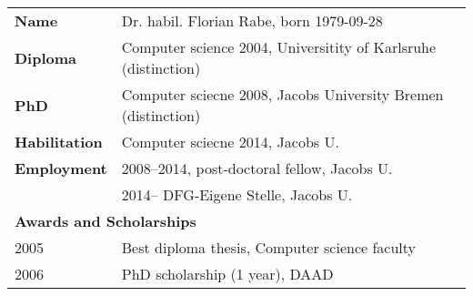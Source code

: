 \newcommand{\tb}{\hspace*{1cm}}

\begin{tabularx}{\textwidth}{lX}
\textbf{Name}           & Dr. habil. Florian Rabe, born 1979-09-28 \\
\textbf{Diploma}        & Computer science 2004, Universitity of Karlsruhe (distinction) \\
\textbf{PhD}            & Computer sciecne 2008, Jacobs University Bremen (distinction) \\
\textbf{Habilitation}   & Computer sciecne 2014, Jacobs U. \\
\textbf{Employment}     & 2008--2014, post-doctoral fellow, Jacobs U. \\
                        & 2014-- DFG-Eigene Stelle, Jacobs U.\\
\multicolumn{2}{l}{\textbf{Awards and Scholarships}}  \\
\tb  2005               & Best diploma thesis, Computer science faculty \\
\tb  2006               & PhD scholarship (1 year), DAAD\\

\end{tabularx}
